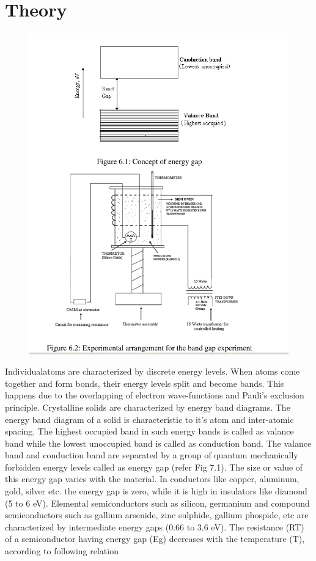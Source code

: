 \documentclass[12pt]{article}
\begin{document}
\section{Theory}
	\begin{figure}[H]
		\centering
		\includegraphics[scale=0.8]{somefig.png}
		\label{it}
	\end{figure}
	Individualatoms are characterized by discrete energy levels. When atoms come together
	and form bonds, their energy levels split and become bands. This happens due to the overlapping
	of electron wave-functions and Pauli’s exclusion principle. Crystalline solids are characterized
	by energy band diagrams. The energy band diagram of a solid is characteristic to it’s atom and
	inter-atomic spacing. The highest occupied band in such energy bands is called as valance band
	while the lowest unoccupied band is called as conduction band. The valance band and
	conduction band are separated by a group of quantum mechanically forbidden energy levels
	called as energy gap (refer Fig 7.1). The size or value of this energy gap varies with the material.
	In conductors like copper, aluminum, gold, silver etc. the energy gap is zero, while it is high in
	insulators like diamond (5 to 6 eV). Elemental semiconductors such as silicon, germanium and
	compound semiconductors such as gallium arsenide, zinc sulphide, gallium phospide, etc are
characterized by intermediate energy gaps (0.66 to 3.6 eV).
The resistance (RT) of a semiconductor having energy gap (Eg) decreases with the
temperature (T), according to following relation
\end{document}
